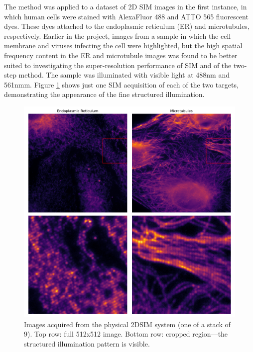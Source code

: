 \documentclass[12pt]{article}
\begin{document}
The method was applied to a dataset of 2D SIM images in the first instance,
in which human cells were stained with AlexaFluor 488 and ATTO 565 fluorescent dyes.
These dyes attached to the endoplasmic reticulum (ER) and microtubules, respectively.
Earlier in the project, images from a sample in which the cell membrane and viruses infecting the cell were highlighted,
but the high spatial frequency content in the ER and microtubule images was found to be better suited to investigating the super-resolution performance of SIM and of the two-step method.
The sample was illuminated with visible light at 488nm and 561nmm.
Figure \ref{fig:2DSIM} shows just one SIM acquisition of each of the two targets,
demonstrating the appearance of the fine structured illumination.

\begin{figure}[hbtp]
    \includegraphics[scale=0.53, center]{figures/2DSIM.png}
    \caption{Images acquired from the physical 2DSIM system (one of a stack of 9).
    Top row: full 512x512 image. Bottom row: cropped region---the structured illumination pattern is visible.}
    \label{fig:2DSIM}
\end{figure}
\end{document}
